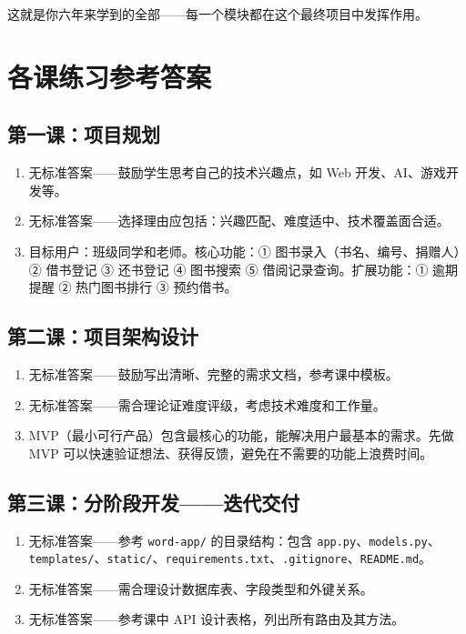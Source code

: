 \documentclass[a4paper,12pt]{ctexart}
\begin{document}
这就是你六年来学到的全部——每一个模块都在这个最终项目中发挥作用。

\section*{\textcolor{blue!70!black}{各课练习参考答案}}

\subsection*{第一课：项目规划}
\begin{enumerate}
  \item 无标准答案——鼓励学生思考自己的技术兴趣点，如 Web 开发、AI、游戏开发等。
  \item 无标准答案——选择理由应包括：兴趣匹配、难度适中、技术覆盖面合适。
  \item 目标用户：班级同学和老师。核心功能：① 图书录入（书名、编号、捐赠人）② 借书登记 ③ 还书登记 ④ 图书搜索 ⑤ 借阅记录查询。扩展功能：① 逾期提醒 ② 热门图书排行 ③ 预约借书。
\end{enumerate}

\subsection*{第二课：项目架构设计}
\begin{enumerate}
  \item 无标准答案——鼓励写出清晰、完整的需求文档，参考课中模板。
  \item 无标准答案——需合理论证难度评级，考虑技术难度和工作量。
  \item MVP（最小可行产品）包含最核心的功能，能解决用户最基本的需求。先做 MVP 可以快速验证想法、获得反馈，避免在不需要的功能上浪费时间。
\end{enumerate}

\subsection*{第三课：分阶段开发——迭代交付}
\begin{enumerate}
  \item 无标准答案——参考 \texttt{word-app/} 的目录结构：包含 \texttt{app.py}、\texttt{models.py}、\texttt{templates/}、\texttt{static/}、\texttt{requirements.txt}、\texttt{.gitignore}、\texttt{README.md}。
  \item 无标准答案——需合理设计数据库表、字段类型和外键关系。
  \item 无标准答案——参考课中 API 设计表格，列出所有路由及其方法。
\end{enumerate}
\end{document}
